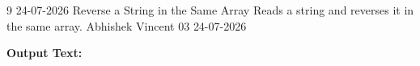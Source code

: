 \clearpage
\label{prog:09}
\programhead
  {9}
  {24-07-2026}
  {Reverse a String in the Same Array}
  {Reads a string and reverses it in the same array.}
  {Abhishek Vincent}
  {03}
  {24-07-2026}

\divider
\textbf{Output Text:}\par
\vspace{2pt}

